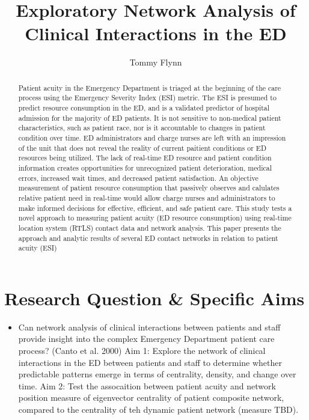 \documentclass[]{elsarticle} %
\providecommand{\tightlist}{%
  \setlength{\itemsep}{0pt}\setlength{\parskip}{0pt}}
\begin{document}
\begin{frontmatter}

  \title{Exploratory Network Analysis of Clinical Interactions in the ED}
    \author[Emory University]{Tommy Flynn}
      \address[Emory University]{Repository
(\url{https://github.com/tommyflynn/Flynn_N741_Project/tree/master/Flynn_Project})}
  
  \begin{abstract}
  Patient acuity in the Emergency Department is triaged at the beginning
  of the care process using the Emergency Severity Index (ESI) metric. The
  ESI is presumed to predict resource consumption in the ED, and is a
  validated predictor of hospital admission for the majority of ED
  patients. It is not sensitive to non-medical patient characteristics,
  such as patient race, nor is it accountable to changes in patient
  condition over time. ED administrators and charge nurses are left with
  an impression of the unit that does not reveal the reality of current
  paitient conditions or ED resources being utilized. The lack of
  real-time ED resource and patient condition information creates
  opportunities for unrecognized patient deterioration, medical errors,
  increased wait times, and decreased patient satisfaction. An objective
  measurement of patient resource consumption that passively observes and
  calulates relative patient need in real-time would allow charge nurses
  and administrators to make informed decisions for effective, efficient,
  and safe patient care. This study tests a novel approach to measuring
  patient acuity (ED resource consumption) using real-time location system
  (RTLS) contact data and network analysis. This paper presents the
  approach and analytic results of several ED contact networks in relation
  to patient acuity (ESI)
  \end{abstract}
  
 \end{frontmatter}

\section{Research Question \& Specific
Aims}\label{research-question-specific-aims}

\begin{itemize}
\tightlist
\item
  Can network analysis of clinical interactions between patients and
  staff provide insight into the complex Emergency Department patient
  care process? (Canto et al. 2000) Aim 1: Explore the network of
  clinical interactions in the ED between patients and staff to
  determine whether predictable patterns emerge in terms of centrality,
  density, and change over time. Aim 2: Test the assocaition between
  patient acuity and network position measure of eigenvector centrality
  of patient composite network, compared to the centrality of teh
  dynamic patient network (measure TBD).
\end{itemize}
\end{document}
